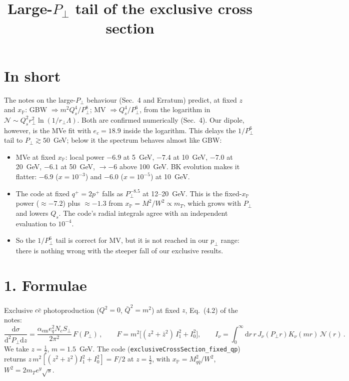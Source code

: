 \documentclass[12pt]{article}
\title{Large-$P_\perp$ tail of the exclusive cross section}
\author{}
\date{}
\newcommand{\xpo}{x_{\mathbb{P}}}
\begin{document}
\sloppy
\maketitle

\section*{In short}

The notes on the large-$P_\perp$ behaviour (Sec.~4 and Erratum) predict, at fixed $z$ and $\xpo$:
GBW $\Rightarrow m^2Q_s^4/P_\perp^8$; MV $\Rightarrow Q_s^4/P_\perp^6$, from the logarithm in
$\mathcal{N}\sim Q_s^2r_\perp^2\ln(1/r_\perp\Lambda)$. Both are confirmed numerically (Sec.~4).
Our dipole, however, is the MVe fit with $e_c=18.9$ inside the logarithm. This delays the
$1/P_\perp^6$ tail to $P_\perp\gtrsim50$~GeV; below it the spectrum behaves almost like GBW:
\begin{itemize}
\item MVe at fixed $\xpo$: local power $-6.9$ at 5~GeV, $-7.4$ at 10~GeV, $-7.0$ at 20~GeV, $-6.1$ at
  50~GeV, $\to-6$ above 100~GeV. BK evolution makes it flatter: $-6.9$ ($x=10^{-3}$) and $-6.0$
  ($x=10^{-5}$) at 10~GeV.
\item The code at fixed $q^+=2p^+$ falls as $P_\perp^{-8.5}$ at 12--20~GeV. This is the fixed-$\xpo$ power
  ($\approx-7.2$) plus $\approx-1.3$ from $\xpo=M^2/W^2\propto m_T$, which grows with $P_\perp$ and lowers
  $Q_s$. The code's radial integrals agree with an independent evaluation to $10^{-4}$.
\item So the $1/P_\perp^6$ tail is correct for MV, but it is not reached in our $p_\perp$ range: there is
  nothing wrong with the steeper fall of our exclusive results.
\end{itemize}

\section*{1. Formulae}

Exclusive $c\bar c$ photoproduction ($Q^2=0$, $\bar Q^2=m^2$) at fixed $z$, Eq.~(4.2) of the notes:
\begin{equation}
\frac{\mathrm{d}\sigma}{\mathrm{d}^2P_\perp\mathrm{d}z}=\frac{\alpha_{\mathrm{em}}e_q^2N_cS_\perp}{2\pi^2}\,F(P_\perp)\,,\qquad
F=m^2\Big[(z^2+\bar z^2)\,I_1^2+I_0^2\Big],\qquad
I_\nu=\int_0^\infty\!\mathrm{d}r\,r\,J_\nu(P_\perp r)K_\nu(mr)\,\mathcal{N}(r)\,.
\end{equation}
We take $z=\tfrac12$, $m=1.5$~GeV. The code (\texttt{exclusiveCrossSection\_fixed\_qp}) returns
$z\,m^2[(z^2+\bar z^2)I_1^2+I_0^2]=F/2$ at $z=\tfrac12$, with $\xpo=M_{q\bar q}^2/W^2$, $W^2=2m_Te^y\sqrt s$.
\end{document}
